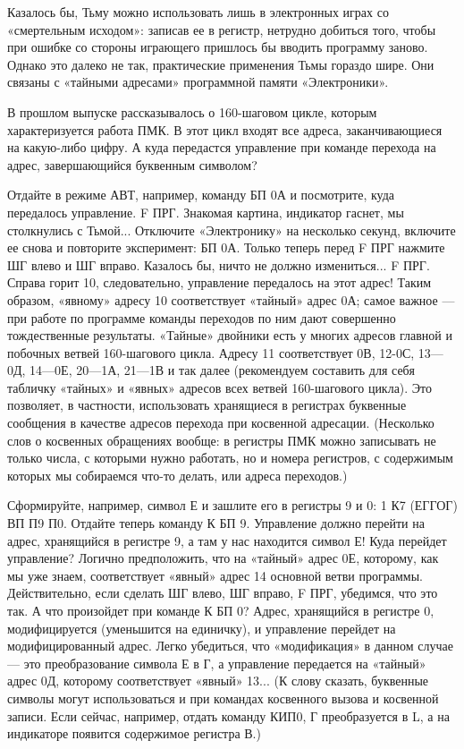\documentclass[11pt,a4paper,oneside]{article}
\begin{document}
Казалось бы, Тьму можно использовать лишь в электронных играх со «смертельным исходом»: записав ее в регистр, нетрудно добиться того, чтобы при ошибке со стороны играющего пришлось бы вводить программу заново. Однако это далеко не так, практические применения Тьмы гораздо шире. Они связаны с «тайными адресами» программной памяти «Электроники».

В прошлом выпуске рассказывалось о 160-шаговом цикле, которым характеризуется работа ПМК. В этот цикл входят все адреса, заканчивающиеся на какую-либо цифру. А куда передастся управление при команде перехода на адрес, завершающийся буквенным символом?

Отдайте в режиме АВТ, например, команду БП 0А и посмотрите, куда передалось управление. F ПРГ. Знакомая картина, индикатор гаснет, мы столкнулись с Тьмой... Отключите «Электронику» на несколько секунд, включите ее снова и повторите эксперимент: БП 0А. Только теперь перед F ПРГ нажмите ШГ влево и ШГ вправо. Казалось бы, ничто не должно измениться... F ПРГ. Справа горит 10, следовательно, управление передалось на этот адрес! Таким образом, «явному» адресу 10 соответствует «тайный» адрес 0А; самое важное — при работе по программе команды переходов по ним дают совершенно тождественные результаты.
«Тайные» двойники есть у многих адресов главной и побочных ветвей 160-шагового цикла. Адресу 11 соответствует 0В, 12-0С, 13—0Д, 14—0Е, 20—1А, 21—1В и так далее (рекомендуем составить для себя табличку «тайных» и «явных» адресов всех ветвей 160-шагового цикла). Это позволяет, в частности, использовать хранящиеся в регистрах буквенные сообщения в качестве адресов перехода при косвенной адресации. (Несколько слов о косвенных обращениях вообще: в регистры ПМК можно записывать не только числа, с которыми нужно работать, но и номера регистров, с содержимым которых мы собираемся что-то делать, или адреса переходов.)

Сформируйте, например, символ Е и зашлите его в регистры 9 и 0: 1 К7 (ЕГГОГ) ВП П9 П0. Отдайте теперь команду К БП 9. Управление должно перейти на адрес, хранящийся в регистре 9, а там у нас находится символ Е! Куда перейдет управление? Логично предположить, что на «тайный» адрес 0Е, которому, как мы уже знаем, соответствует «явный» адрес 14 основной
ветви программы. Действительно, если сделать ШГ влево, ШГ вправо, F ПРГ, убедимся, что это так. А что произойдет при команде К БП 0? Адрес, хранящийся в регистре 0, модифицируется (уменьшится на единичку), и управление перейдет на модифицированный адрес. Легко убедиться, что «модификация» в данном случае — это преобразование символа Е в Г, а управление передается на «тайный» адрес 0Д, которому соответствует «явный» 13... (К слову сказать, буквенные символы могут использоваться и при командах косвенного вызова и косвенной записи. Если сейчас, например, отдать команду КИП0, Г преобразуется в L, а на индикаторе появится содержимое регистра В.)
\end{document}
